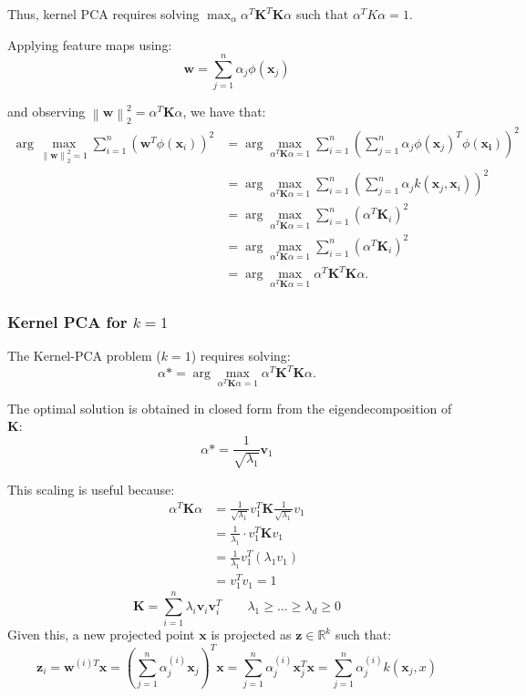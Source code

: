 \documentclass[a4paper,10pt,twoside]{article}
\newcommand\norm[1]{\left\lVert#1\right\rVert}
\begin{document}
Thus, kernel PCA requires solving $\max_{\alpha}\alpha^T\mathbf{K}^T\mathbf{K}\alpha$ such that $\alpha^TK\alpha=1$.

Applying feature maps using:
\begin{equation*}
    \mathbf{w}=\sum_{j=1}^{n}\alpha_j\phi(\mathbf{x}_j)
\end{equation*}

and observing $\norm{\mathbf{w}}_2^2=\alpha^T\mathbf{K}\alpha$, we have that:
\begin{align*}
    \arg\max_{\norm{\mathbf{w}}_2^2=1}\sum_{i=1}^{n}(\mathbf{w}^T\phi(\mathbf{x}_i))^2&=\arg\max_{\alpha^T\mathbf{K}\alpha=1}\sum_{i=1}^{n}(\sum_{j=1}^{n}\alpha_j\phi(\mathbf{x}_j)^T\phi(\mathbf{x_i}))^2\\
    &=\arg\max_{\alpha^T\mathbf{K}\alpha=1}\sum_{i=1}^{n}(\sum_{j=1}^{n}\alpha_jk(\mathbf{x}_j, \mathbf{x}_i))^2\\
    &=\arg\max_{\alpha^T\mathbf{K}\alpha=1}\sum_{i=1}^{n}(\alpha^T\mathbf{K}_i)^2\\
    &=\arg\max_{\alpha^T\mathbf{K}\alpha=1}\sum_{i=1}^{n}(\alpha^T\mathbf{K}_i)^2\\
    &=\arg\max_{\alpha^T\mathbf{K}\alpha=1}\alpha^T\mathbf{K}^T\mathbf{K}\alpha.
\end{align*}

\subsubsection{Kernel PCA for $k=1$}

The Kernel-PCA problem ($k=1$) requires solving:
\begin{equation*}
    \alpha*=\arg\max_{\alpha^T\mathbf{K}\alpha=1}\alpha^T\mathbf{K}^T\mathbf{K}\alpha.
\end{equation*}

The optimal solution is obtained in closed form from the eigendecomposition of $\mathbf{K}$:
\begin{equation*}
    \alpha* = \frac{1}{\sqrt{\lambda_1}}\mathbf{v}_1
\end{equation*}

This scaling is useful because:
\begin{align*}
    \alpha^T\mathbf{K}\alpha &= \frac{1}{\sqrt{\lambda_1}}v_1^T\mathbf{K}\frac{1}{\sqrt{\lambda_1}}v_1\\
    &=\frac{1}{\lambda_1}\cdot v_1^T\mathbf{K}v_1\\
    &=\frac{1}{\lambda_1}v_1^T(\lambda_1v_1)\\
    &=v_1^Tv_1=1
\end{align*}
\begin{equation*}
    \mathbf{K}=\sum_{i=1}^{n}\lambda_i\mathbf{v}_i\mathbf{v}_i^T\qquad\lambda_1\geq\ldots\geq\lambda_d\geq0
\end{equation*}
Given this, a new projected point $\mathbf{x}$ is projected as $\mathbf{z}\in\mathbb{R}^{k}$ such that:
\begin{equation*}
    \mathbf{z}_i=\mathbf{w}^{(i)T}\mathbf{x}=(\sum_{j=1}^{n}\alpha_j^{(i)}\mathbf{x}_j)^T\mathbf{x}=\sum_{j=1}^{n}\alpha_j^{(i)}\mathbf{x}_j^T\mathbf{x}=\sum_{j=1}^{n}\alpha_j^{(i)}k(\mathbf{x}_j, x)
\end{equation*}
\end{document}

